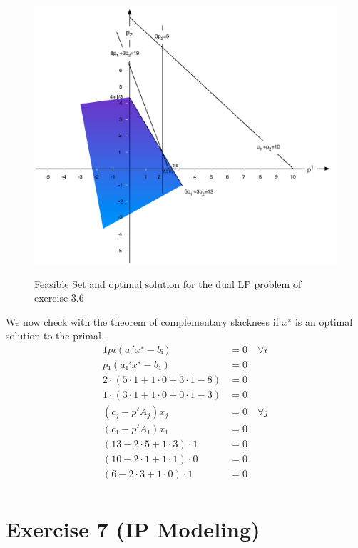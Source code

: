 \documentclass[a4paper, 12pt]{report}
\begin{document}
\begin{figure}[htbp]
    \caption{Feasible Set and optimal solution for the dual LP problem of
             exercise 3.6}
    \vskip 0.2cm
    \centering
    \includegraphics[width=\textwidth]
        {Figures/Exercise_3_6_Feasible_Region_Dual}
    \label{figure:Exercise_3_6_Feasible_Region_Dual}
\end{figure}

We now check with the theorem of complementary slackness if $x^∗$ is an optimal
solution to the primal.
\begin{alignat*}{1}
    pi(aᵢ′x^∗−bᵢ)           &= 0 \quad ∀i\\
    p₁(a₁′x^∗-b₁)           &= 0\\[5pt]
    2·(5·1 + 1·0 + 3·1 - 8) &= 0\\
    1·(3·1 + 1·0 + 0·1 - 3) &= 0\\[10pt]
    (c_j − p′A_j)x_j        &= 0 \quad∀j\\
    (c₁ − p′A₁)x₁           &= 0\\[5pt]
    (13 − 2·5 + 1·3) · 1    &= 0\\
    (10 − 2·1 + 1·1) · 0    &= 0\\
    ( 6 − 2·3 + 1·0) · 1    &= 0\\
\end{alignat*}

\section{Exercise 7 (IP Modeling)}
\end{document}
